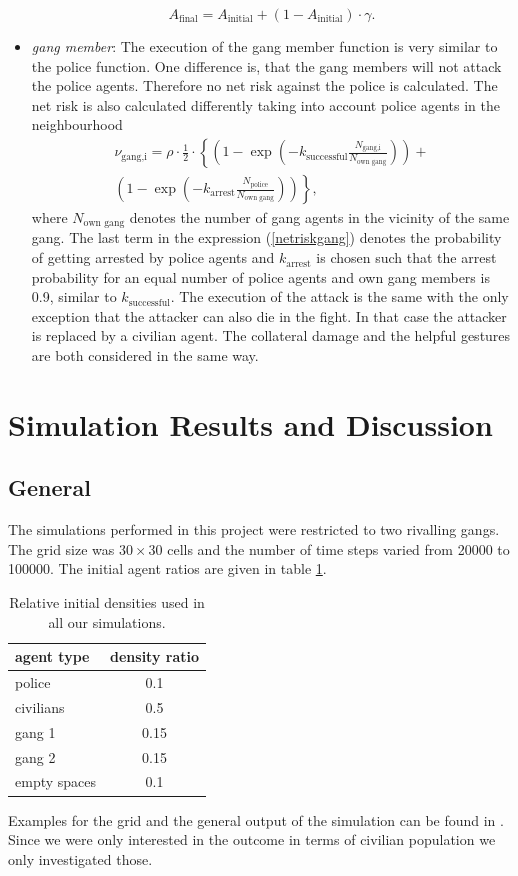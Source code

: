\documentclass[11pt]{article}
\begin{document}
\begin{itemize}
\begin{equation}
A_{\text{final}}=A_{\text{initial}}+(1-A_{\text{initial}})\cdot \gamma.\label{angeradjust2}
\end{equation}
\item \textit{gang member}: The execution of the gang member function is very similar to the police function. One difference is, that the gang members will not attack the police agents. Therefore no net risk against the police is calculated. The net risk is also calculated differently taking into account police agents in the neighbourhood
\begin{eqnarray}
\nu_{\text{gang,i}}=\rho\cdot\frac{1}{2}\cdot \left\{\left( 1-\exp\left(-k_\text{successful}\frac{N_{\text{gang,i}}}{N_\text{own gang}}\right)\right)+\right.\\
 \left.\left( 1-\exp\left(-k_\text{arrest}\frac{N_{\text{police}}}{N_\text{own gang}}\right)\right)\right\},\label{netriskgang}
\end{eqnarray}
where $N_{\text{own gang}}$ denotes the number of gang agents in the vicinity of the same gang. The last term in the expression (\ref{netriskgang}) denotes the probability of getting arrested by police agents and $k_\text{arrest}$ is chosen such that the arrest probability for an equal number of police agents and own gang members is 0.9, similar to $k_\text{successful}$. The execution of the attack is the same with the only exception that the attacker can also die in the fight. In that case the attacker is replaced by a civilian agent. The collateral damage and the helpful gestures are both considered in the same way. 
 \end{itemize}



\section{Simulation Results and Discussion}
\subsection{General}
The simulations performed in this project were restricted to two rivalling gangs. The grid size was $30 \times 30$ cells and the number of time steps varied from 20000 to 100000. The initial agent ratios are given in table \ref{pop}.
\begin{table}[h!]
\centering
\begin{tabular}{lc}
\hline
agent type & density ratio\\
\hline
police & 0.1\\
civilians & 0.5\\
gang 1 & 0.15\\
gang 2 & 0.15\\
empty spaces & 0.1
\end{tabular}
\caption{Relative initial densities used in all our simulations.}\label{pop}
\end{table}
 Examples for the grid and the general output of the simulation can be found in \cite{epstein, bennett}. Since we were only interested in the outcome in terms of civilian population we only investigated those. 
\end{document}
